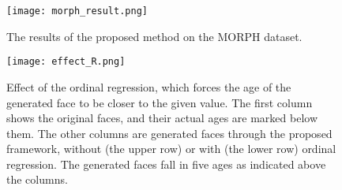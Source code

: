 \documentclass{article}
\begin{document}
\begin{figure}[!ht]
\centering
\texttt{[image: morph\_result.png]}
\caption{The results of the proposed method on the MORPH dataset.}
\label{morph_resutl}
\end{figure}

\begin{table}[ht]
    \centering
    \caption{The comparisions between CMAAE-OR with oridnal regression () and CMAAE-OR without . The performance is measured by the Mean Absolute Error (MAE) metric.}\label{MAE}
\vspace{-1em}
\end{table}

\begin{figure}[!ht]
\centering
\texttt{[image: effect\_R.png]}
\caption{Effect of the ordinal regression, which forces the age of the generated face to be closer to the given value. The first column shows the original faces, and their actual ages are marked below them. The other columns are generated faces through the proposed framework, without (the upper row) or with (the lower row) ordinal regression. The generated faces fall in five ages as indicated above the columns.}
\label{effect_r}
\end{figure}
\end{document}
